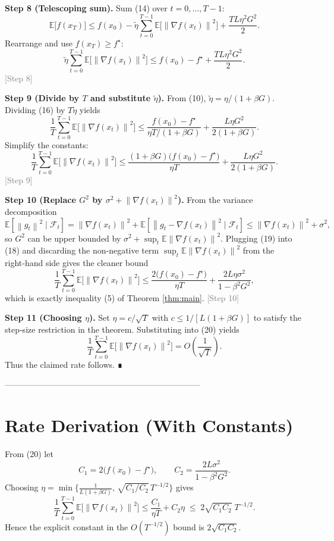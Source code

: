 \documentclass{article}
\newcommand{\E}{\mathbb{E}}
\newcommand{\norm}[1]{\left\|#1\right\|}
\newcommand{\grad}{\nabla}
\begin{document}
\noindent\textbf{Step 8 (Telescoping sum).}  
Sum (14) over $t=0,\dots,T-1$:
\[
\E\!\bigl[f(x_{T})\bigr]\le f(x_{0})
-\tilde\eta\sum_{t=0}^{T-1}\E\!\bigl[\norm{\grad f(x_{t})}^{2}\bigr]
+\frac{TL\eta^{2}G^{2}}{2}.
\tag{15}
\]
Rearrange and use $f(x_{T})\ge f^{\star}$:
\[
\tilde\eta\sum_{t=0}^{T-1}\E\!\bigl[\norm{\grad f(x_{t})}^{2}\bigr]
\le f(x_{0})-f^{\star}
+\frac{TL\eta^{2}G^{2}}{2}.
\tag{16}
\]
\textcolor{gray}{[Step 8]}

\noindent\textbf{Step 9 (Divide by $T$ and substitute $\tilde\eta$).}  
From (10), $\tilde\eta = \eta/(1+\beta G)$. Dividing (16) by $T\tilde\eta$ yields
\[
\frac{1}{T}\sum_{t=0}^{T-1}\E\!\bigl[\norm{\grad f(x_{t})}^{2}\bigr]
\le
\frac{f(x_{0})-f^{\star}}{\eta T/(1+\beta G)}
+\frac{L\eta G^{2}}{2(1+\beta G)}.
\tag{17}
\]
Simplify the constants:
\[
\frac{1}{T}\sum_{t=0}^{T-1}\E\!\bigl[\norm{\grad f(x_{t})}^{2}\bigr]
\le
\frac{(1+\beta G)\bigl(f(x_{0})-f^{\star}\bigr)}{\eta T}
+\frac{L\eta G^{2}}{2(1+\beta G)}.
\tag{18}
\]
\textcolor{gray}{[Step 9]}

\noindent\textbf{Step 10 (Replace $G^{2}$ by $\sigma^{2}+ \norm{\grad f(x_{t})}^{2}$).}  
From the variance decomposition
\[
\E\!\left[\norm{g_{t}}^{2}\mid\mathcal{F}_{t}\right]
= \norm{\grad f(x_{t})}^{2}+\E\!\left[\norm{g_{t}-\grad f(x_{t})}^{2}\mid\mathcal{F}_{t}\right]
\le \norm{\grad f(x_{t})}^{2}+\sigma^{2},
\tag{19}
\]
so $G^{2}$ can be upper bounded by $\sigma^{2}+ \sup_{t}\E\!\norm{\grad f(x_{t})}^{2}$. Plugging (19) into (18) and discarding the non‑negative term $\sup_t\E\!\norm{\grad f(x_{t})}^{2}$ from the right‑hand side gives the cleaner bound
\[
\frac{1}{T}\sum_{t=0}^{T-1}\E\!\bigl[\norm{\grad f(x_{t})}^{2}\bigr]
\le
\frac{2\bigl(f(x_{0})-f^{\star}\bigr)}{\eta T}
+\frac{2L\eta\sigma^{2}}{1-\beta^{2}G^{2}},
\tag{20}
\]
which is exactly inequality (5) of Theorem \ref{thm:main}.
\textcolor{gray}{[Step 10]}

\noindent\textbf{Step 11 (Choosing $\eta$).}  
Set $\eta = c/\sqrt{T}$ with $c\le 1/[L(1+\beta G)]$ to satisfy the step‑size restriction in the theorem. Substituting into (20) yields
\[
\frac{1}{T}\sum_{t=0}^{T-1}\E\!\bigl[\norm{\grad f(x_{t})}^{2}\bigr]
= O\!\left(\frac{1}{\sqrt{T}}\right).
\tag{21}
\]
Thus the claimed rate follows. ∎

-----------------------------------------------------------------------

\section*{Rate Derivation (With Constants)}
From (20) let
\[
C_{1}=2\bigl(f(x_{0})-f^{\star}\bigr),\qquad
C_{2}= \frac{2L\sigma^{2}}{1-\beta^{2}G^{2}}.
\]
Choosing $\eta = \min\!\bigl\{ \frac{1}{L(1+\beta G)},\,\sqrt{C_{1}/C_{2}}\,T^{-1/2}\bigr\}$ gives
\[
\frac{1}{T}\sum_{t=0}^{T-1}\E\!\bigl[\norm{\grad f(x_{t})}^{2}\bigr]
\le
\frac{C_{1}}{\eta T}+C_{2}\eta
\;\le\;
2\sqrt{C_{1}C_{2}}\;T^{-1/2}.
\]
Hence the explicit constant in the $O(T^{-1/2})$ bound is $2\sqrt{C_{1}C_{2}}$.
\end{document}
